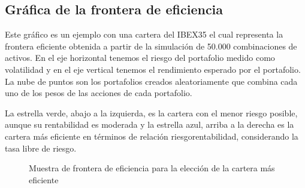 \documentclass[letterpaper,10pt,spanish]{sphinxmanual}
\begin{document}
\begin{sphinxVerbatim}[commandchars=\\\{\},numbers=left,firstnumber=1,stepnumber=1]
  \PYG{p}{[}\PYG{p}{[}\PYG{p}{]}\PYG{p}{]}

  
  \PYG{p}{[}
    \PYG{p}{[}\PYG{p}{]}    \PYG{p}{[}\PYG{p}{]}
\PYG{p}{]}
\end{sphinxVerbatim}


\subsection{Gráfica de la frontera de eficiencia}
\label{\detokenize{AutomatizacionFinanciera:grafica-de-la-frontera-de-eficiencia}}
\sphinxAtStartPar
Este gráfico es un ejemplo con una cartera del IBEX35 el cual representa la frontera eficiente obtenida a partir de la simulación de 50.000 combinaciones de activos. En el eje horizontal tenemos el riesgo del portafolio medido como volatilidad y en el eje vertical tenemos el rendimiento esperado por el portafolio. La nube de puntos son los portafolios creados aleatoriamente que combina cada uno de los pesos de las acciones de cada portafolio.

\sphinxAtStartPar
La estrella verde, abajo a la izquierda, es la cartera con el menor riesgo posible, aunque su rentabilidad es moderada y la estrella azul, arriba a la derecha es la cartera más eficiente en términos de relación riesgo\textendash{}rentabilidad, considerando la tasa libre de riesgo.

\begin{figure}[htbp]
\centering
\capstart

\noindent{}
\caption{ Muestra de frontera de eficiencia para la elección de la cartera más eficiente}\label{\detokenize{AutomatizacionFinanciera:id4}}\end{figure}
\end{document}
